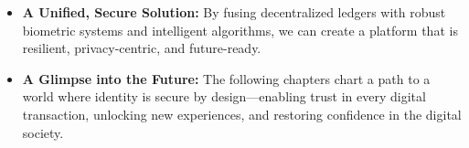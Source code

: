 \begin{itemize}
    \item \textbf{A Unified, Secure Solution:} By fusing decentralized ledgers with robust biometric systems and intelligent algorithms, we can create a platform that is resilient, privacy-centric, and future-ready.
    \item \textbf{A Glimpse into the Future:} The following chapters chart a path to a world where identity is secure by design—enabling trust in every digital transaction, unlocking new experiences, and restoring confidence in the digital society.
\end{itemize}



